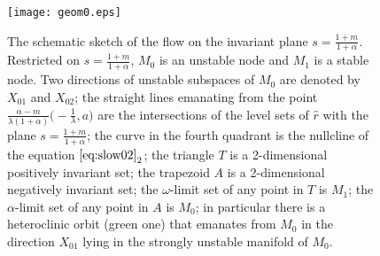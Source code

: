 \documentclass[11pt]{article}
\theoremstyle{remark}
\begin{document}
\begin{figure}[ht]
 \centering
  \texttt{[image: geom0.eps]} \label{fig:flow0}
  \caption{The schematic sketch of the flow on the invariant plane $s=\frac{1+m}{1+\alpha}$.  Restricted on $s=\frac{1+m}{1+\alpha}$, $M_0$ is an unstable node and $M_1$ is a stable node. Two directions of unstable subspaces of $M_0$ are denoted by $X_{01}$ and $X_{02}$; the straight lines emanating from the
  point $\frac{\alpha-m}{\lambda(1+\alpha)}\big(-\frac{1}{\lambda},a\big)$ are the intersections of the level sets of $\hat{r}$
  with the plane $s=\frac{1+m}{1+\alpha}$; the curve in the fourth quadrant is the nullcline of the equation $\eqref{eq:slow02}_2$; the triangle $T$ is a 2-dimensional positively invariant set; the trapezoid $A$ is a 2-dimensional negatively invariant set; the $\omega$-limit set of any point in $T$ is $M_1$;
  the $\alpha$-limit set of any point in $A$ is $M_0$; in particular there is a heteroclinic orbit (green one) that emanates from $M_0$ in the direction $X_{01}$ lying
  in the strongly unstable manifold of $M_0$.}
\end{figure}
\end{document}

